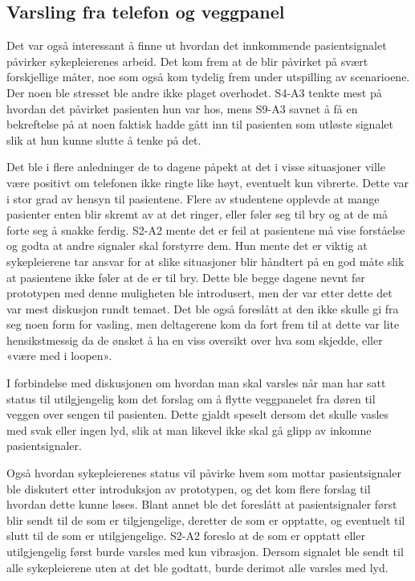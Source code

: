 \subsection{Varsling fra telefon og veggpanel}
Det var også interessant å finne ut hvordan det innkommende pasientsignalet påvirker sykepleierenes arbeid. Det kom frem at de blir påvirket på svært forskjellige måter, noe som også kom tydelig frem under utspilling av scenarioene.
Der noen ble stresset ble andre ikke plaget overhodet. S4-A3 tenkte mest på hvordan det påvirket pasienten hun var hos, mens S9-A3 savnet å få en bekreftelse på at noen faktisk hadde gått inn til pasienten som utløste signalet slik at hun kunne slutte å tenke på det. 

\noindent
Det ble i flere anledninger de to dagene påpekt at det i visse situasjoner ville være positivt om telefonen ikke ringte like høyt, eventuelt kun vibrerte.
Dette var i stor grad av hensyn til pasientene. Flere av studentene opplevde at mange pasienter enten blir skremt av at det ringer, eller føler seg til bry og at de må forte seg å snakke ferdig. 
S2-A2 mente det er feil at pasientene må vise forståelse og godta at andre signaler skal forstyrre dem. Hun mente det er viktig at sykepleierene tar ansvar for at slike situasjoner blir håndtert på en god måte slik at pasientene ikke føler at de er til bry.
Dette ble begge dagene nevnt før prototypen med denne muligheten ble introdusert, men der var etter dette det var mest diskusjon rundt temaet. 
Det ble også foreslått at den ikke skulle gi fra seg noen form for vasling, men deltagerene kom da fort frem til at dette var lite hensikstmessig da de ønsket å ha en viss oversikt over hva som skjedde, eller «være med i loopen».

\noindent
I forbindelse med diskusjonen om hvordan man skal varsles når man har satt status til utilgjengelig kom det forslag om å flytte veggpanelet fra døren til veggen over sengen til pasienten. Dette gjaldt speselt dersom det skulle vasles med svak eller ingen lyd, slik at man likevel ikke skal gå glipp av inkomne pasientsignaler.

\noindent
Også hvordan sykepleierenes status vil påvirke hvem som mottar pasientsignaler ble diskutert etter introduksjon av prototypen, og det kom flere forslag til hvordan dette kunne løses. Blant annet ble det foreslått at pasientsignaler først blir sendt til de som er tilgjengelige, deretter de som er opptatte, og eventuelt til slutt til de som er utilgjengelige. S2-A2 foreslo at de som er opptatt eller utilgjengelig først burde varsles med kun vibrasjon. Dersom signalet ble sendt til alle sykepleierene uten at det ble godtatt, burde derimot alle varsles med lyd.